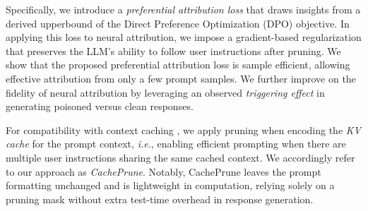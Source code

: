 \noindent 
Specifically, we introduce a \textit{preferential attribution loss} that draws insights from a derived upperbound of the Direct Preference Optimization (DPO) \cite{rafailov2024direct} objective. 
In applying this loss to neural attribution, we impose a gradient-based regularization that preserves the LLM’s ability to follow user instructions after pruning.
We show that the proposed preferential  attribution loss is sample efficient, allowing effective attribution from only a few prompt samples.
We further improve on the fidelity of neural attribution by leveraging an observed \textit{triggering effect} in generating poisoned versus clean responses.

For compatibility with context caching \cite{gemin-cc, openai-cc}, we apply pruning when encoding the \textit{KV cache} for the prompt context, \emph{i.e.}, enabling efficient prompting when there are multiple user instructions sharing the same cached context. 
We accordingly refer to our approach as \textit{CachePrune}.
Notably, CachePrune leaves the prompt formatting unchanged and is lightweight in computation, relying solely on a pruning mask without extra test-time overhead in response generation.

